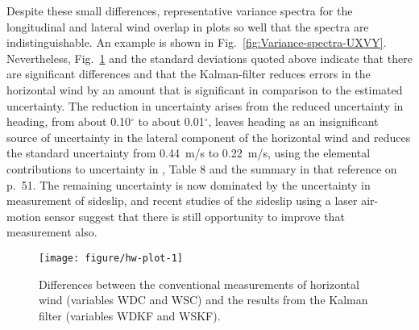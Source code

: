 \documentclass[12pt,twoside,english,12pt,twoside,english]{article}\usepackage[]{graphicx}\usepackage[]{color}
\makeatletter
\def\maxwidth{ %
  \ifdim\Gin@nat@width>\linewidth
    \linewidth
  \else
    \Gin@nat@width
  \fi
}
\newenvironment{knitrout}{}{} %
\let\OrgIndex\index
\renewcommand*{\index}[1]{\OrgIndex{#1}}
\makeatother
\begin{document}
Despite these small differences, representative variance
spectra
for the longitudinal and lateral wind overlap
in plots so well that the spectra are indistinguishable. An example
is shown in Fig.~\ref{fig:Variance-spectra-UXVY}.
Nevertheless, Fig.~\ref{fig:hw-plot}
and the standard deviations
quoted above indicate that there are significant differences and that
the Kalman-filter reduces errors
in the horizontal wind by an amount that is significant in comparison
to the estimated uncertainty. The reduction in uncertainty arises
from the reduced uncertainty in heading, from about 0.10$^{\circ}$
to about 0.01$^{\circ}$, leaves heading as an insignificant source
of uncertainty in the lateral component of the horizontal wind and
reduces the standard uncertainty from 0.44~m/s to 0.22~m/s, using
the elemental contributions to uncertainty in \citet{Cooper2016ncartn},
Table 8 and the summary in that reference on p.~51. The remaining
uncertainty is now dominated by the uncertainty in measurement of
sideslip, and recent studies of the sideslip using a laser air-motion
sensor suggest that there is still opportunity to improve that measurement
also.



\begin{knitrout}
\color{fgcolor}\begin{figure}

{\centering \texttt{[image: figure/hw-plot-1]} 

}

\caption[Differences between the conventional measurements of horizontal wind and the results from the Kalman filter.]{Differences between the conventional measurements of horizontal wind (variables WDC and WSC) and the results from the Kalman filter (variables WDKF and WSKF).}\label{fig:hw-plot}
\end{figure}


\end{knitrout}
\end{document}
